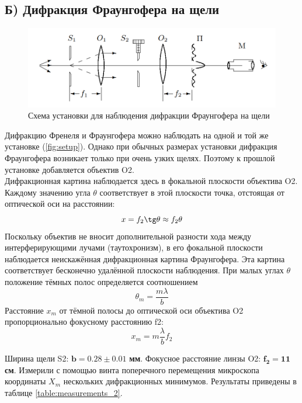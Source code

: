 \subsection*{Б) Дифракция Фраунгофера на щели}
\begin{figure}[!ht]
    \centering
    \includegraphics[width=12cm]{images/setup_2.png}
    \caption{Схема установки для наблюдения дифракции Фраунгофера на щели}
\end{figure}
Дифракцию Френеля и Фраунгофера можно наблюдать на одной и той же установке (\ref{fig:setup}). Однако при обычных размерах установки дифракция Фраунгофера возникает только при очень узких щелях. Поэтому к прошлой установке добавляется объектив O2.\\\indent
Дифракционная картина наблюдается здесь в фокальной плоскости объектива O2. Каждому значению угла $\theta$ соответствует в этой плоскости точка, отстоящая от оптической оси на расстоянии:
\begin{equation}
    x = f_2 \tg\theta\approx f_2\theta
\end{equation}
\indent Поскольку объектив не вносит дополнительной разности хода
между интерферирующими лучами (таутохронизм), в его фокальной
плоскости наблюдается неискажённая дифракционная картина Фраунгофера. Эта картина соответствует бесконечно удалённой плоскости
наблюдения.
При малых углах $\theta$ положение тёмных полос определяется соотношением
\begin{equation}
    \theta_m = \frac{m\lambda}{b}
\end{equation}
\indent
Расстояние $x_m$ от тёмной полосы до оптической оси объектива O2 пропорционально фокусному расстоянию f2:
\begin{equation}
    x_m = m\frac{\lambda}{b}f_2 \label{eq:fraunogofer1_1}
\end{equation}

\indent
Ширина щели S2: $\mathbf{b = 0.28\pm 0.01}$ \textbf{мм}. Фокусное расстояние линзы O2: $\mathbf{f_2 = 11}$ \textbf{см}.
Измерили с помощью винта поперечного перемещения микроскопа координаты $X_m$ нескольких дифракционных минимумов. Результаты приведены в таблице \ref{table:measurements_2}.

